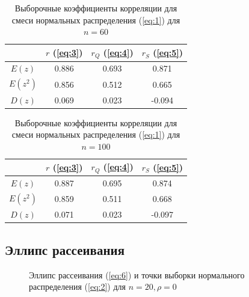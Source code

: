 \documentclass{article}
\begin{document}
\begin{table} [hb]
\begin{center}
\begin{tabular}{|c|c|c|c|}
\hline 
 & $r$ (\ref{eq:3}) & $r_Q$ (\ref{eq:4}) & $r_S$ (\ref{eq:5}) \\ 
\hline 
$E(z)$ & 0.886 & 0.693 & 0.871 \\
\hline 
$E(z^2)$ & 0.856 & 0.512 & 0.665 \\
\hline 
$D(z)$ & 0.069 & 0.023 & -0.094 \\
\hline 
\end{tabular} 
\caption{Выборочные коэффициенты корреляции для смеси нормальных распределения (\ref{eq:1}) для $n = 60$}
\end{center}
\end{table}

\begin{table} [hb]
\begin{center}
\begin{tabular}{|c|c|c|c|}
\hline 
 & $r$ (\ref{eq:3}) & $r_Q$ (\ref{eq:4}) & $r_S$ (\ref{eq:5}) \\ 
\hline 
$E(z)$ & 0.887 & 0.695 & 0.874 \\
\hline 
$E(z^2)$ & 0.859 & 0.511 & 0.668 \\
\hline 
$D(z)$ & 0.071 & 0.023 & -0.097 \\
\hline 
\end{tabular} 
\caption{Выборочные коэффициенты корреляции для смеси нормальных распределения (\ref{eq:1}) для $n = 100$}
\end{center}
\end{table}

\newpage
\subsection{Эллипс рассеивания}

\begin{figure}[h]
\caption{Эллипс рассеивания (\ref{eq:6}) и точки выборки нормального распределения (\ref{eq:2}) для $n = 20, \rho = 0$}
\end{figure}
\end{document}
